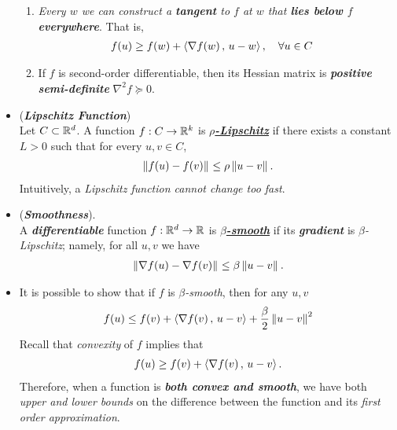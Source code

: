 \documentclass[11pt]{article}
\begin{document}
\begin{itemize}
\begin{remark}
\begin{enumerate}
\item \emph{Every $w$ we can construct a \textbf{tangent} to $f$ at $w$ that \textbf{lies below $f$ everywhere}}. That is,
\begin{align*}
f(u) &\ge f(w) +\left\langle \nabla f(w)\,,\, u - w \right\rangle, \quad \forall u \in C
\end{align*}

\item If $f$ is second-order differentiable, then its Hessian matrix is \emph{\textbf{positive semi-definite}} $\nabla^2 f \succeq 0$.
\end{enumerate}
\end{remark}

\item \begin{definition}(\textbf{\emph{Lipschitz Function}})\\
Let $C \subset {\mathbb R}^d$. A function $f : C \to {\mathbb R}^k$ is \underline{\emph{\textbf{$\rho$-Lipschitz}}} if there exists a constant $L > 0$ such that  for every $u,v \in C$,
\begin{align*}
\left\|f(u) - f(v)\right\|_{} \le \rho \left\|u - v\right\|_{}.
\end{align*}  Intuitively, a \emph{Lipschitz function cannot change too fast}.
\end{definition}

\item \begin{definition} (\emph{\textbf{Smoothness}}). \\
A \emph{\textbf{differentiable}} function $f : {\mathbb R}^d \to {\mathbb R}$ is \underline{\emph{\textbf{$\beta$-smooth}}} if its \emph{\textbf{gradient}} is \emph{$\beta$-Lipschitz}; namely, for all $u,v$ we have 
\begin{align*}
\left\|\nabla f(u) - \nabla f(v)\right\|_{} \le \beta \left\|u - v\right\|_{}.
\end{align*} 
\end{definition}

\item \begin{remark}
It is possible to show that if $f$ is \emph{$\beta$-smooth}, then for any $u, v$
\begin{align}
f(u) \le f(v) + \left\langle \nabla f(v)\,,\, u - v \right\rangle  + \frac{\beta}{2}\left\|u -v\right\|_{}^2 \label{ineqn: smooth_fun_bound}
\end{align} Recall that \emph{convexity} of $f$ implies that 
\begin{align*}
f(u) \ge f(v) + \left\langle \nabla f(v)\,,\, u - v \right\rangle.
\end{align*}
Therefore, when a function is \emph{\textbf{both convex and smooth}}, we have both \emph{upper and lower bounds} on the difference between the function and its \emph{first order approximation}.
\end{remark}


\end{itemize}
\end{document}
